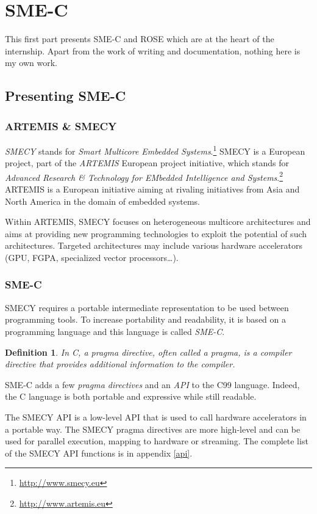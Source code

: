 \documentclass[a4paper]{article}
\newtheorem{defdef}{Definition}
\begin{document}
\section{SME-C}
	This first part presents SME-C and ROSE which are at the heart of the internship. Apart from the work of writing and documentation, nothing here is my own work.
	\subsection{Presenting SME-C}
	\subsubsection{ARTEMIS \& SMECY}
 	\emph{SMECY} stands for \emph{Smart Multicore Embedded
      Systems}.\footnote{\url{http://www.smecy.eu}} SMECY is a European
    project, part of the \emph{ARTEMIS} European project initiative, which stands for \emph{Advanced Research \& Technology for EMbedded Intelligence and Systems}.\footnote{\url{http://www.artemis.eu}} ARTEMIS is a European initiative aiming at rivaling initiatives from Asia and North America in the domain of embedded systems.

	Within ARTEMIS, SMECY focuses on heterogeneous multicore architectures and aims at providing new programming technologies to exploit the potential of such architectures. Targeted architectures may include various hardware accelerators (GPU, FGPA, specialized vector processors\ldots).

	\subsubsection{SME-C}
	SMECY requires a portable intermediate representation to be used
    between programming tools. To increase portability and readability, it
    is based on a programming language and this language is called
    \emph{SME-C}.

	\begin{defdef} In C, a \emph{pragma directive}, often called a \emph{pragma}, is a compiler directive that provides additional information to the compiler.
	\end{defdef}
	
	SME-C adds a few \emph{pragma directives} and an \emph{API} to the C99 language. Indeed, the C language is both portable and expressive while still readable.
	
	The SMECY API is a low-level API that is used to call hardware
    accelerators in a portable way. The SMECY pragma directives are more
    high-level and can be used for parallel execution, mapping to hardware
    or streaming. The complete list of the SMECY API functions is in
    appendix \ref{api}.
\end{document}
